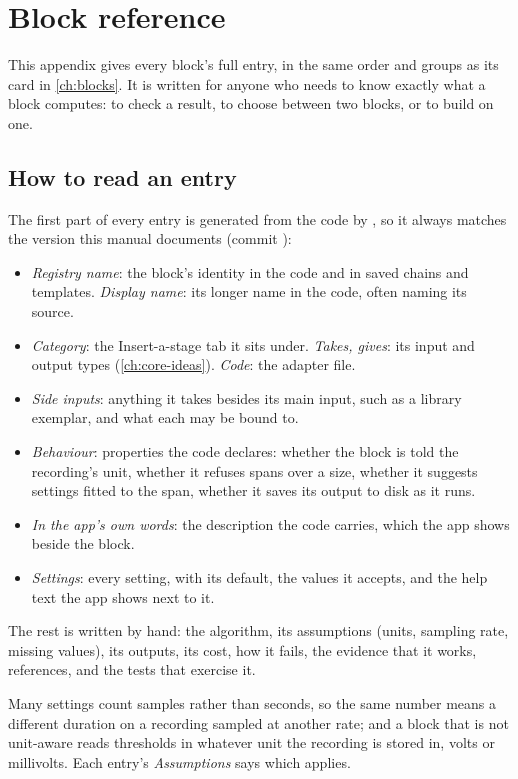 \chapter{Block reference}\label{app:blocks}

This appendix gives every block's full entry, in the same order and groups as its card in
\cref{ch:blocks}. It is written for anyone who needs to know exactly what a block computes:
to check a result, to choose between two blocks, or to build on one.

\section*{How to read an entry}
The first part of every entry is generated from the code by
, so it always matches the version this manual documents
(commit \texttt{\ubversion}):
\begin{itemize}
\item \emph{Registry name}: the block's identity in the code and in saved chains and
  templates. \emph{Display name}: its longer name in the code, often naming its source.
\item \emph{Category}: the Insert-a-stage tab it sits under. \emph{Takes, gives}: its input
  and output types (\cref{ch:core-ideas}). \emph{Code}: the adapter file.
\item \emph{Side inputs}: anything it takes besides its main input, such as a library
  exemplar, and what each may be bound to.
\item \emph{Behaviour}: properties the code declares: whether the block is told the
  recording's unit, whether it refuses spans over a size, whether it suggests settings fitted
  to the span, whether it saves its output to disk as it runs.
\item \emph{In the app's own words}: the description the code carries, which the app shows
  beside the block.
\item \emph{Settings}: every setting, with its default, the values it accepts, and the help
  text the app shows next to it.
\end{itemize}
The rest is written by hand: the algorithm, its assumptions (units, sampling rate, missing
values), its outputs, its cost, how it fails, the evidence that it works, references, and
the tests that exercise it.

\begin{watchout}
Many settings count samples rather than seconds, so the same number means a different
duration on a recording sampled at another rate; and a block that is not unit-aware reads
thresholds in whatever unit the recording is stored in, volts or millivolts. Each entry's
\emph{Assumptions} says which applies.
\end{watchout}

